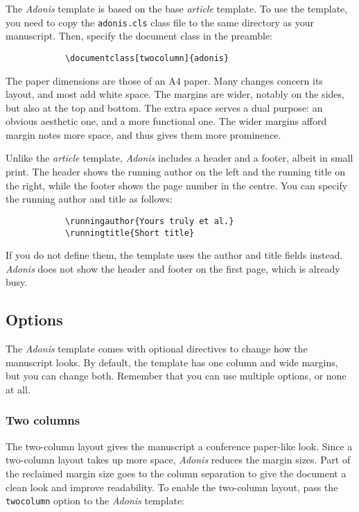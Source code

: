 \documentclass{adonis}
\begin{document}
		The \textit{Adonis} template is based on the base \textit{article} template.
		To use the template, you need to copy the \verb+adonis.cls+ class file to the same directory as your manuscript.
		Then, specify the document class in the preamble:
		
		\begin{verbatim}
			\documentclass[twocolumn]{adonis}
		\end{verbatim}
		
		The paper dimensions are those of an A4 paper.
		Many changes concern its layout, and most add white space.
		The margins are wider, notably on the sides, but also at the top and bottom.
		The extra space serves a dual purpose: an obvious aesthetic one, and a more functional one.
		The wider margins afford margin notes more space, and thus gives them more prominence.
		
		Unlike the \textit{article} template, \textit{Adonis} includes a header and a footer, albeit in small print.
		The header shows the running author on the left and the running title on the right, while the footer shows the page number in the centre.
		You can specify the running author and title as follows:
		
		\begin{verbatim}
			\runningauthor{Yours truly et al.}
			\runningtitle{Short title}
		\end{verbatim}
		
		If you do not define them, the template uses the author and title fields instead.
		\textit{Adonis} does not show the header and footer on the first page, which is already busy.
		
		\subsection{Options}
		
			The \textit{Adonis} template comes with optional directives to change how the manuscript looks.
			By default, the template has one column and wide margins, but you can change both.
			Remember that you can use multiple options, or none at all.
		
			\subsubsection{Two columns}
			
				The two-column layout gives the manuscript a conference paper-like look.
				Since a two-column layout takes up more space, \textit{Adonis} reduces the margin sizes.
				Part of the reclaimed margin size goes to the column separation to give the document a clean look and improve readability.
				To enable the two-column layout, pass the \verb+twocolumn+ option to the \textit{Adonis} template:
			
\end{document}
